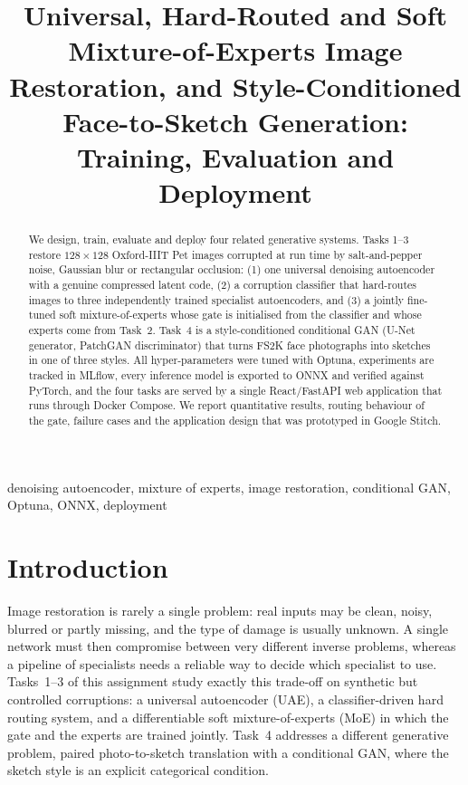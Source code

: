 \documentclass[conference]{IEEEtran}
\begin{document}
\title{Universal, Hard-Routed and Soft Mixture-of-Experts Image Restoration, and Style-Conditioned Face-to-Sketch Generation: Training, Evaluation and Deployment}

\author{
}

\maketitle

\begin{abstract}
We design, train, evaluate and deploy four related generative systems. Tasks 1--3 restore $128\times128$ Oxford-IIIT Pet images corrupted at run time by salt-and-pepper noise, Gaussian blur or rectangular occlusion: (1) one universal denoising autoencoder with a genuine compressed latent code, (2) a corruption classifier that hard-routes images to three independently trained specialist autoencoders, and (3) a jointly fine-tuned soft mixture-of-experts whose gate is initialised from the classifier and whose experts come from Task~2. Task~4 is a style-conditioned conditional GAN (U-Net generator, PatchGAN discriminator) that turns FS2K face photographs into sketches in one of three styles. All hyper-parameters were tuned with Optuna, experiments are tracked in MLflow, every inference model is exported to ONNX and verified against PyTorch, and the four tasks are served by a single React/FastAPI web application that runs through Docker Compose. We report quantitative results, routing behaviour of the gate, failure cases and the application design that was prototyped in Google Stitch.
\end{abstract}

\begin{IEEEkeywords}
denoising autoencoder, mixture of experts, image restoration, conditional GAN, Optuna, ONNX, deployment
\end{IEEEkeywords}

\section{Introduction}
Image restoration is rarely a single problem: real inputs may be clean, noisy, blurred or partly missing, and the type of damage is usually unknown. A single network must then compromise between very different inverse problems, whereas a pipeline of specialists needs a reliable way to decide which specialist to use. Tasks~1--3 of this assignment study exactly this trade-off on synthetic but controlled corruptions: a universal autoencoder (UAE), a classifier-driven hard routing system, and a differentiable soft mixture-of-experts (MoE) in which the gate and the experts are trained jointly. Task~4 addresses a different generative problem, paired photo-to-sketch translation with a conditional GAN, where the sketch style is an explicit categorical condition.
\end{document}
